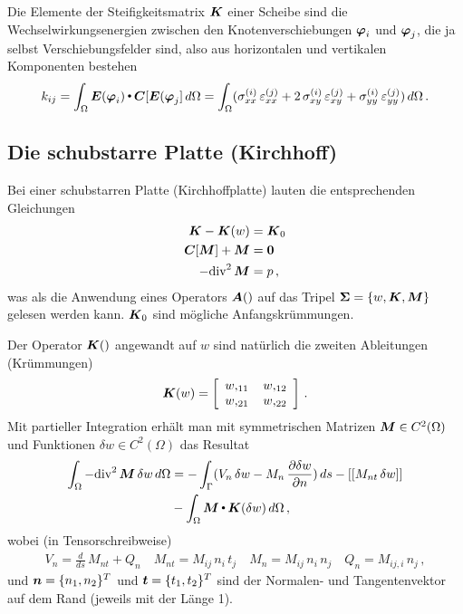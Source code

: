 Die Elemente der Steifigkeitsmatrix $\mbox{\boldmath $K$}$ einer Scheibe sind die Wechselwirkungsenergien zwischen den Knotenverschiebungen $\mbox{\boldmath $\varphi$}_i$ und $\mbox{\boldmath $\varphi$}_j$, die ja selbst Verschiebungsfelder sind, also aus horizontalen und vertikalen Komponenten bestehen
\begin{align}
k_{ij} = \int_{\Omega} \mbox{\boldmath $E$}(\mbox{\boldmath $\varphi$}_i) {\,\scriptscriptstyle \stackrel{\bullet}{{}}}\, \mbox{\boldmath $C$}[\mbox{\boldmath $E$}(\mbox{\boldmath $\varphi$}_j] \,d\Omega  =\int_{\Omega} (\sigma_{xx}^{(i)}\,\varepsilon_{xx}^{(j)} + 2\,\sigma_{xy}^{(i)}\,\varepsilon_{xy}^{(j)} + \sigma_{yy}^{(i)}\,\varepsilon_{yy}^{(j)})\,d\Omega\,.
\end{align}

\textcolor{sectionTitleBlue}{\section{Die schubstarre Platte (Kirchhoff)}}
Bei einer schubstarren Platte (Kirchhoffplatte) lauten die entsprechenden Gleichungen
\begin{subequations}
\begin{align}\label{Eq65}
\mbox{\boldmath $K$} - \mbox{\boldmath $K$}(w) &= \mbox{\boldmath $K$}_0 \\
\mbox{\boldmath $C$}[\mbox{\boldmath $M$}] + \mbox{\boldmath $M$} &= \mbox{\boldmath $0$} \\
- \text{div}^2\,\mbox{\boldmath $M$} &= p\,,
\end{align}
\end{subequations}
was als die Anwendung eines Operators $\mbox{\boldmath $A$}()$ auf das Tripel $\mbox{\boldmath $\Sigma$} = \{w, \mbox{\boldmath $K$}, \mbox{\boldmath $M$}\}$ gelesen werden kann. $\mbox{\boldmath $K$}_0$ sind m\"{o}gliche Anfangskr\"{u}mmungen.

Der Operator $\mbox{\boldmath $K$}()$ angewandt auf $w$ sind nat\"{u}rlich die zweiten Ableitungen (\glq Kr\"{u}mmungen\grq{})
\begin{align}
\vek K(w) = \left[ \barr {r @{\hspace{4mm}}r  }
      w,_{11} & w,_{12} \\
      w,_{21} & w,_{22} \\
     \earr \right]\,.
\end{align}
Mit partieller Integration erh\"{a}lt man mit symmetrischen Matrizen $\mbox{\boldmath $M$} \in C^2(\Omega)$ und Funktionen $\delta w \in C^2(\Omega)$ das Resultat
\begin{align}
\int_{\Omega} - \text{div}^2\,\mbox{\boldmath $M$}\,\delta w \,d\Omega &= - \int_{\Gamma} (V_n\,\delta w - M_n\,\frac{\partial \delta w}{\partial n}) \,ds - [[M_{nt}\,\delta w]] \nonumber \\
&- \int_{\Omega} \mbox{\boldmath $M$} {\,\scriptscriptstyle \stackrel{\bullet}{{}}}\, \mbox{\boldmath $K$}(\delta w)\,d\Omega\,,
\end{align}
wobei (in Tensorschreibweise)
\begin{align}
V_n = \frac{d}{ds}\,M_{nt} + Q_n \quad M_{nt} = M_{ij}\,n_i\,t_j \quad M_n = M_{ij}\,n_i\,n_j \quad Q_n = M_{ij,i}\,n_j\,,
\end{align}
und $\mbox{\boldmath $n$} = \{n_1, n_2\}^T$  und $\mbox{\boldmath $t$} = \{t_1, t_2\}^T$ sind der Normalen- und Tangentenvektor auf dem Rand (jeweils mit der L\"{a}nge 1).

